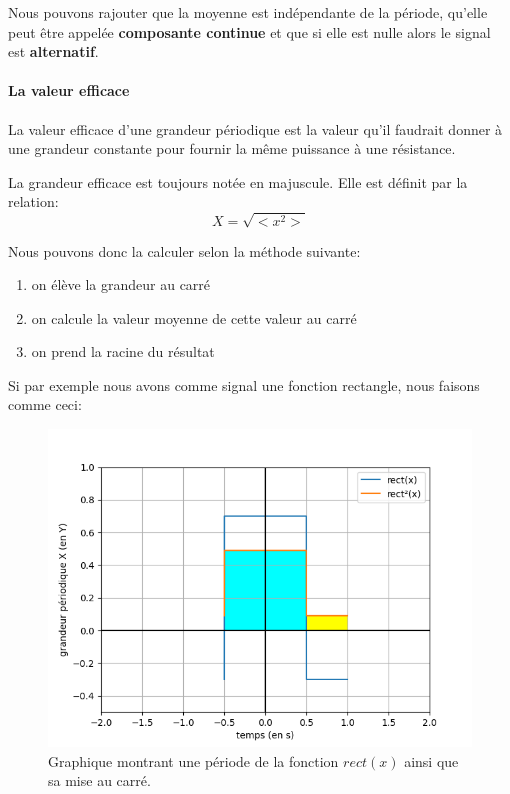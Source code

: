 \documentclass[11pt,a4paper,openany]{book}
\begin{document}
Nous pouvons rajouter que la moyenne est indépendante de la période, qu'elle peut être appelée \textbf{composante continue} et que si elle est nulle alors le signal est \textbf{alternatif}.

\paragraph{La valeur efficace} 
\begin{Definition}
La valeur efficace d'une grandeur périodique est la valeur qu'il faudrait donner à une grandeur constante pour fournir la même puissance à une résistance.
\end{Definition} 

La grandeur efficace est toujours notée en majuscule. Elle est définit par la relation:
\begin{equation}
X = \sqrt{< x^{2} >}
\label{relationGrandeurEfficace}
\end{equation}

Nous pouvons donc la calculer selon la méthode suivante:
\begin{enumerate}
\item on élève la grandeur au carré
\item on calcule la valeur moyenne de cette valeur au carré
\item on prend la racine du résultat
\end{enumerate}

Si par exemple nous avons comme signal une fonction rectangle, nous faisons comme ceci:
\begin{figure}[!h]
\begin{center}
\includegraphics[scale=0.8]{Images/grapheAuCarre.png} 
\caption{Graphique montrant une période de la fonction $ rect(x) $ ainsi que sa mise au carré.}
\label{grapheFonctionMiseAuCarre}
\end{center}
\end{figure}
\end{document}
